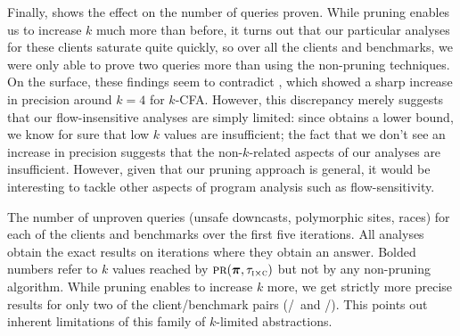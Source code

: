 Finally,  shows the effect on the number of queries proven.
While pruning enables us to increase $k$ much more than before, it turns out
that our particular analyses for these clients saturate quite quickly, so
over all the clients and benchmarks,
we were only able to prove two queries more than using the non-pruning techniques.
On the surface, these findings seem to contradict \cite{liang10abstraction},
which showed a sharp increase in precision around $k=4$ for $k$-CFA.  However,
this discrepancy merely suggests that our flow-insensitive analyses are simply
limited: since \cite{liang10abstraction} obtains a lower bound, we know for
sure that low $k$ values are insufficient; the fact that we don't see an
increase in precision suggests that the non-$k$-related aspects of our analyses
are insufficient.  However, given that our pruning approach is general, it
would be interesting to tackle other aspects of program analysis such as
flow-sensitivity.

\begin{table}
\small
\centering

\caption{\label{tab:numUnproven} The number of unproven queries (unsafe
downcasts, polymorphic sites, races) for each of the clients and benchmarks
over the first five iterations.
All analyses obtain the exact results on iterations where they obtain an answer.
Bolded numbers refer to $k$ values reached by $\text{\sc pr}(\mbox{\boldmath$\pi$},\tau_{\text{\sc i} \times \text{\sc c}})$
but not by any non-pruning algorithm.
While pruning enables to increase $k$ more, we get strictly more precise results
for only two of the client/benchmark pairs (\downcast/\hedc\ and \downcast/\lusearch).
This points out inherent limitations of this family of $k$-limited abstractions.
}
\end{table}

